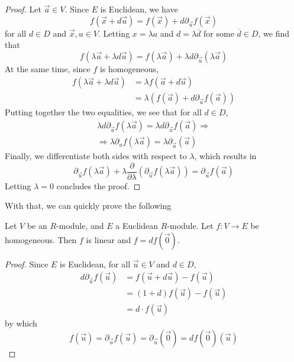 \begin{proof}
  Let \( \vec a\in V \). Since \( E \) is Euclidean, we have
  \begin{equation*}
    f(\vec x + d\vec u) = f(\vec x) + d\partial_{\vec u}f(\vec x)
  \end{equation*}
  for all \( d\in D \) and \( \vec x,u\in V \). Letting \( x=\lambda a \) and \( d = \lambda\overline d \) for some \( \overline d\in D \), we find that
  \begin{equation*}
    f(\lambda\vec a + \lambda d\vec u) = f(\lambda\vec a)+\lambda d\partial_{\vec u}(\lambda\vec a)
  \end{equation*}
  At the same time, since \( f \) is homogeneous,
  \begin{align*}
    f(\lambda\vec a + \lambda d\vec u) &= \lambda f(\vec a + d\vec u) \\
                                       &= \lambda (f(\vec a) + d\partial_{\vec u}f(\vec a))
  \end{align*}
  Putting together the two equalities, we see that for all \( d\in D \),
  \begin{align*}
    \lambda d\partial_{\vec u}f(\lambda\vec a) = \lambda d\partial_{\vec u}f(\vec a) \Rightarrow \\
    \Rightarrow \lambda\partial_{u}f(\lambda\vec a) = \lambda\partial_{\vec u}(\vec a)
  \end{align*}
  Finally, we differentiate both sides with respect to \( \lambda \), which results in
  \begin{equation*}
    \partial_{\vec u}f(\lambda\vec a) + \lambda\frac{\partial}{\partial\lambda}(\partial_{\vec u}f(\lambda\vec a)) = \partial_{\vec u}f(\vec a)
  \end{equation*}
  Letting \( \lambda=0 \) concludes the proof.
\end{proof}

With that, we can quickly prove the following

\begin{proposition}
  Let \( V \) be an \( R \)-module, and \( E \) a Euclidean \( R \)-module. Let \( f:V\to E \) be homogeneous. Then \( f \) is linear and \( f = df(\vec 0) \).
  \label{prop:homg}
\end{proposition}

\begin{proof}
  Since \( E \) is Euclidean, for all \( \vec u\in V \) and \( d\in D \),
  \begin{align*}
    d\partial_{\vec u}f(\vec u) &= f(\vec u + d\vec u) - f(\vec u) \\
                                &= (1+d)f(\vec u) - f(\vec u)      \\
				&= d\cdot f(\vec u)
  \end{align*}
  by which
  \begin{equation*}
    f(\vec u) = \partial_{\vec u}f(\vec u) = \partial_{\vec u}(\vec 0) = df(\vec 0 )(\vec u)
  \end{equation*} 
\end{proof}
